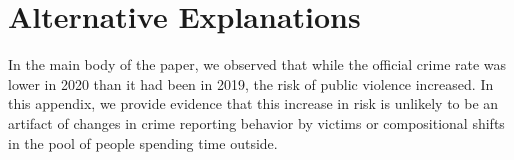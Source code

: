 

\newpage



\newpage
\clearpage
\section{Alternative Explanations} \label{sec:appendix_alternative}
In the main body of the paper, we observed that while the official crime rate was lower in 2020 than it had been in 2019, the risk of public violence increased. In this appendix, we provide evidence that this increase in risk is unlikely to be an artifact of changes in crime reporting behavior by victims or compositional shifts in the pool of people spending time outside.

